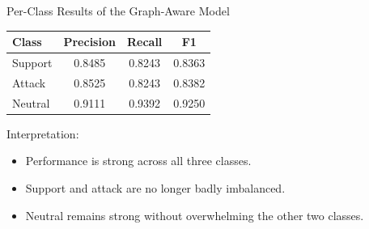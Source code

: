 \documentclass[aspectratio=169]{beamer}
\begin{document}
\begin{frame}{Per-Class Results of the Graph-Aware Model}
\centering
\begin{tabular}{lccc}
\toprule
Class & Precision & Recall & F1 \\
\midrule
Support & 0.8485 & 0.8243 & 0.8363 \\
Attack & 0.8525 & 0.8243 & 0.8382 \\
Neutral & 0.9111 & 0.9392 & 0.9250 \\
\bottomrule
\end{tabular}

\vspace{0.5cm}
Interpretation:
\begin{itemize}
  \item Performance is strong across all three classes.
  \item Support and attack are no longer badly imbalanced.
  \item Neutral remains strong without overwhelming the other two classes.
\end{itemize}
\end{frame}
\end{document}
